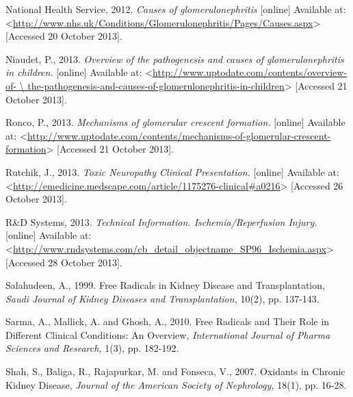 \documentclass[12pt]{report}
\begin{document}
National Health Service, 2012. \textit{Causes of glomerulonephritis} [online] Available at: <\url{http://www.nhs.uk/Conditions/Glomerulonephritis/Pages/Causes.aspx}> [Accessed 20 October 2013].
\newline
\newline

Niaudet, P., 2013. \textit{Overview of the pathogenesis and causes of glomerulonephritis in children.} [online] Available at: <\url{http://www.uptodate.com/contents/overview-of- \ the-pathogenesis-and-causes-of-glomerulonephritis-in-children}> [Accessed 21 October 2013].
\newline
\newline

Ronco, P., 2013. \textit{Mechanisms of glomerular crescent formation.} [online] Available at: <\url{http://www.uptodate.com/contents/mechanisms-of-glomerular-crescent-formation}> [Accessed 21 October 2013].
\newline
\newline

Rutchik, J., 2013. \textit{Toxic Neuropathy Clinical Presentation.} [online] Available at: <\url{http://emedicine.medscape.com/article/1175276-clinical#a0216}> [Accessed 26 October 2013].
\newline
\newline

R\&D Systems, 2013. \textit{Technical Information. Ischemia/Reperfusion Injury.} [online] Available at: <\url{http://www.rndsystems.com/cb_detail_objectname_SP96_Ischemia.aspx}> [Accessed 28 October 2013].
\newline
\newline

Salahudeen, A., 1999. Free Radicals in Kidney Disease and Transplantation, \textit{Saudi Journal of Kidney Diseases and Transplantation,} 10(2), pp. 137-143.
\newline
\newline

Sarma, A., Mallick, A. and Ghosh, A., 2010. Free Radicals and Their Role in Different Clinical Conditions: An Overview, \textit{International Journal of Pharma Sciences and Research,} 1(3), pp. 182-192.
\newline
\newline

Shah, S., Baliga, R., Rajapurkar, M. and Fonseca, V., 2007. Oxidants in Chronic Kidney Disease, \textit{Journal of the American Society of Nephrology,} 18(1), pp. 16-28.
\newline
\newline
\end{document}
